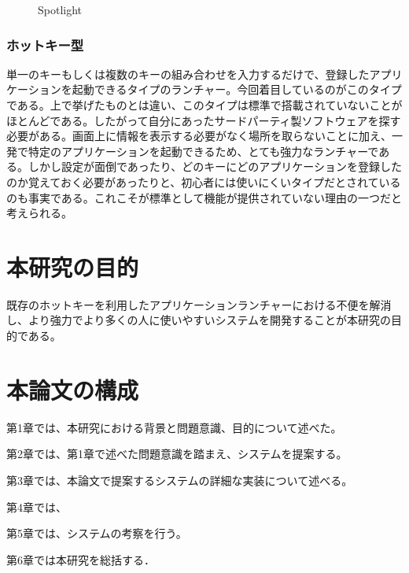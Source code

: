\begin{figure}[h]
    \begin{center}
    \end{center}
    \caption{Spotlight}
    \label{fig:spotlight}
\end{figure}

\subsubsection{ホットキー型}

単一のキーもしくは複数のキーの組み合わせを入力するだけで、登録したアプリケーションを起動できるタイプのランチャー。今回着目しているのがこのタイプである。上で挙げたものとは違い、このタイプは標準で搭載されていないことがほとんどである。したがって自分にあったサードパーティ製ソフトウェアを探す必要がある。画面上に情報を表示する必要がなく場所を取らないことに加え、一発で特定のアプリケーションを起動できるため、とても強力なランチャーである。しかし設定が面倒であったり、どのキーにどのアプリケーションを登録したのか覚えておく必要があったりと、初心者には使いにくいタイプだとされているのも事実である。これこそが標準として機能が提供されていない理由の一つだと考えられる。

\section{本研究の目的}

既存のホットキーを利用したアプリケーションランチャーにおける不便を解消し、より強力でより多くの人に使いやすいシステムを開発することが本研究の目的である。

\section{本論文の構成}

第1章では、本研究における背景と問題意識、目的について述べた。

第2章では、第1章で述べた問題意識を踏まえ、システムを提案する。

第3章では、本論文で提案するシステムの詳細な実装について述べる。

第4章では、

第5章では、システムの考察を行う。

第6章では本研究を総括する．